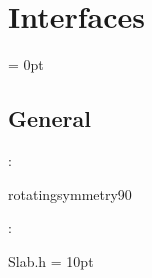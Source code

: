 
\section{Interfaces} 


\parskip = 0pt

\vspace{3mm} \subsection*{General}

: 

rotatingsymmetry90
\vspace{2mm}

\vspace{5mm}

: 

Slab.h
\vspace{2mm}\parskip = 10pt 
